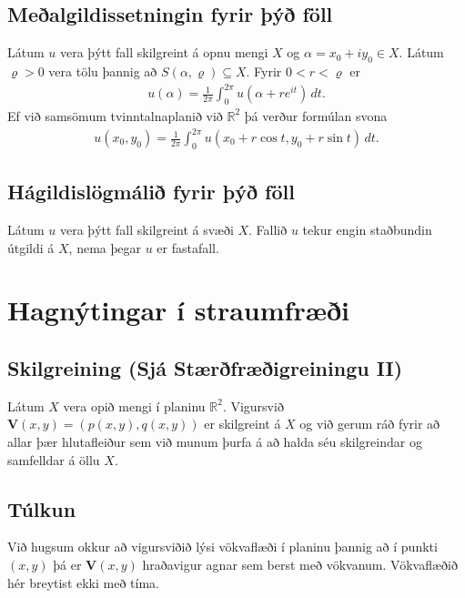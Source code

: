 \documentclass[a4paper,10pt,icelandic]{sphinxmanual}
\begin{document}
\subsection{Meðalgildissetningin fyrir þýð föll}
\label{\detokenize{Kafli05:mealgildissetningin-fyrir-y-foll}}
Látum \(u\) vera þýtt fall skilgreint á opnu mengi \(X\) og \(\alpha= x_0+iy_0\in X\). Látum \(\varrho>0\) vera tölu þannig að \({S}(\alpha, \varrho)\subseteq X\). Fyrir \(0<r<\varrho\) er
\begin{equation*}
\begin{split}u(\alpha)=\frac{1}{2\pi}\int_0^{2\pi}u(\alpha+re^{it})\,dt.\end{split}
\end{equation*}
Ef við samsömum tvinntalnaplanið við \({\mathbb{R}}^2\) þá verður formúlan
svona
\begin{equation*}
\begin{split}u(x_0,y_0)=\frac{1}{2\pi}\int_0^{2\pi}u(x_0+r\cos t, y_0+r\sin t)\,dt.\end{split}
\end{equation*}

\subsection{Hágildislögmálið fyrir þýð föll}
\label{\detokenize{Kafli05:hagildislogmali-fyrir-y-foll}}
Látum \(u\) vera þýtt fall skilgreint á svæði \(X\). Fallið \(u\) tekur engin staðbundin útgildi á \(X\), nema þegar \(u\) er fastafall.


\section{Hagnýtingar í straumfræði}
\label{\detokenize{Kafli05:hagnytingar-i-straumfraei}}

\subsection{Skilgreining (Sjá Stærðfræðigreiningu II)}
\label{\detokenize{Kafli05:skilgreining-sja-staerfraeigreiningu-ii}}
Látum \(X\) vera opið mengi í planinu \({\mathbb{R}}^2\). Vigursvið \({\mathbf V}(x,y)=(p(x,y), q(x,y))\) er skilgreint á \(X\) og við gerum ráð fyrir að allar þær hlutafleiður sem við munum þurfa á að halda séu skilgreindar og samfelldar á öllu \(X\).


\subsection{Túlkun}
\label{\detokenize{Kafli05:tulkun}}
Við hugsum okkur að vigursviðið lýsi vökvaflæði í planinu þannig að í punkti \((x,y)\) þá er \({\mathbf V}(x,y)\) hraðavigur agnar sem berst með vökvanum. Vökvaflæðið hér breytist ekki með tíma.
\end{document}

